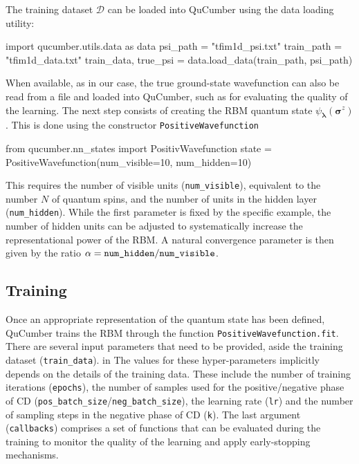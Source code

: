 \documentclass[submission, Phys]{SciPost}
\begin{document}
The training dataset $\mathcal{D}$ can be loaded into QuCumber using the data loading utility:
\begin{python}
import qucumber.utils.data as data
psi_path = "tfim1d_psi.txt"
train_path = "tfim1d_data.txt"
train_data, true_psi = data.load_data(train_path, psi_path)
\end{python}
When available, as in our case, the true ground-state wavefunction can also be read from a file and loaded into QuCumber, such as for evaluating the quality of the learning. The next step consists of creating the RBM quantum state $\psi_{\bm{\lambda}}(\bm{\sigma}^z)$. This is done using the constructor \verb|PositiveWavefunction|
\begin{python}
from qucumber.nn_states import PositivWavefunction
state = PositiveWavefunction(num_visible=10, num_hidden=10)
\end{python}
This requires the number of visible units (\verb|num_visible|), equivalent to the number $N$ of quantum spins, and the number of units in the hidden layer (\verb|num_hidden|). While the first parameter is fixed by the specific example, the number of hidden units can be adjusted to systematically increase the representational power of the RBM. A natural convergence parameter is then given by the ratio $\alpha = \verb|num_hidden|/\verb|num_visible|$.




\subsection{Training}
Once an appropriate representation of the quantum state has been defined, QuCumber trains the RBM through the function \verb|PositiveWavefunction.fit|. There are several input parameters that need to be provided, aside the training dataset (\verb|train_data|). in The values for these hyper-parameters implicitly depends on the details of the training data. These include the number of training iterations (\verb|epochs|), the number of samples used for the positive/negative phase of CD (\verb|pos_batch_size|/\verb|neg_batch_size|), the learning rate (\verb|lr|) and the number of sampling steps in the negative phase of CD (\verb|k|). The last argument (\verb|callbacks|) comprises a set of functions that can be evaluated during the training to monitor the quality of the learning and apply early-stopping mechanisms. 
\end{document}
